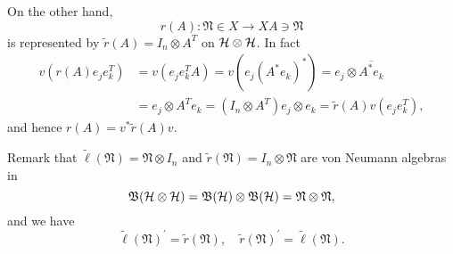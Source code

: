On the other hand, 
$$
r(A):\mathfrak{N}\in X \to XA\ni\mathfrak{N}
$$ 
is represented by $\tilde{r}(A)=I_n\otimes A^T$ on $\cal{H}\otimes\cal{H}$.
In fact
 \begin{equation}
 \begin{split}
 v(r(A)e_je_k^T)&=v(e_je_k^TA)=v(e_j(A^\ast e_k)^\ast)=e_j\otimes \overline{A^\ast e_k}\\
 &= e_j \otimes A^T e_k= (I_n\otimes A^T)e_j\otimes  e_k=\tilde{r}(A)v(e_je_k^T),
 \end{split} 
 \end{equation}
 and hence $r(A)=v^{\ast}\tilde{r}(A) v$. 

Remark that $\tilde{\ell}(\mathfrak{N})=\mathfrak{N}\otimes I_n$ and $\tilde{r}(\mathfrak{N})=I_n\otimes \mathfrak{N}$ are von Neumann algebras in 
$$\mathfrak{B}({\cal H}\otimes{\cal H})=\mathfrak{B}({\cal H})\otimes \mathfrak{B}({\cal H})=\mathfrak{N}\otimes \mathfrak{N},
$$
and we have 
\begin{equation}\label{lr}
\tilde{\ell}(\mathfrak{N})^\prime=\tilde{r}({\mathfrak{N}}),\quad
\tilde{r}(\mathfrak{N})^\prime=\tilde{\ell}(\mathfrak{N}).
\end{equation}